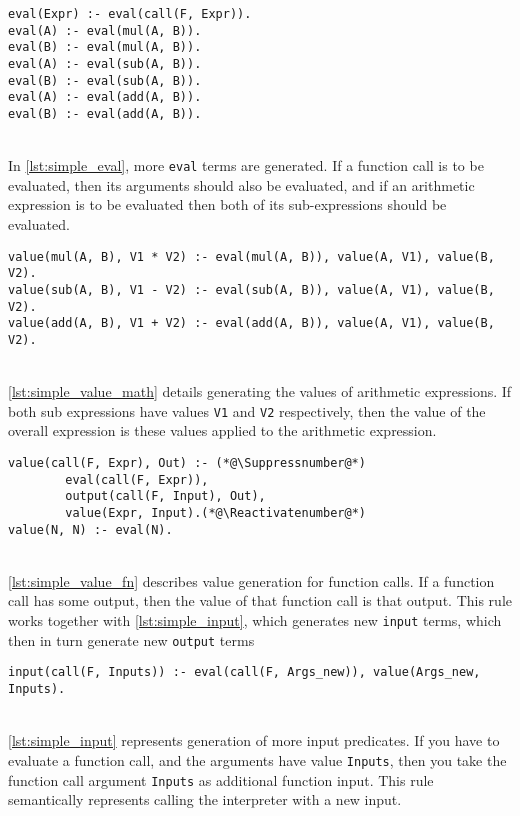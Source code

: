 \begin{lstlisting}[caption={Eval propagation}, label={lst:simple_eval}, firstnumber=77]
eval(Expr) :- eval(call(F, Expr)).
eval(A) :- eval(mul(A, B)).
eval(B) :- eval(mul(A, B)).
eval(A) :- eval(sub(A, B)).
eval(B) :- eval(sub(A, B)).
eval(A) :- eval(add(A, B)).
eval(B) :- eval(add(A, B)).
\end{lstlisting}
\mbox{}\\
In \ref{lst:simple_eval}, more \lstinline!eval! terms are generated. If a function call is to be evaluated, then its arguments should also be evaluated, and if an arithmetic expression is to be evaluated then both of its sub-expressions should be evaluated. \\ 

\begin{lstlisting}[caption={Value generation for arithmetic}, label={lst:simple_value_math}, firstnumber=69]
value(mul(A, B), V1 * V2) :- eval(mul(A, B)), value(A, V1), value(B, V2).
value(sub(A, B), V1 - V2) :- eval(sub(A, B)), value(A, V1), value(B, V2).
value(add(A, B), V1 + V2) :- eval(add(A, B)), value(A, V1), value(B, V2).
\end{lstlisting}
\mbox{}\\
\ref{lst:simple_value_math} details generating the values of arithmetic expressions. If both sub expressions have values \lstinline!V1! and \lstinline!V2! respectively, then the value of the overall expression is these values applied to the arithmetic expression. \\

\begin{lstlisting}[caption={Value generation for function calls}, label={lst:simple_value_fn}, firstnumber=72]
value(call(F, Expr), Out) :- (*@\Suppressnumber@*)
		eval(call(F, Expr)), 
		output(call(F, Input), Out), 
		value(Expr, Input).(*@\Reactivatenumber@*)	
value(N, N) :- eval(N).
\end{lstlisting}
\mbox{}\\
\ref{lst:simple_value_fn} describes value generation for function calls. If a function call has some output, then the value of that function call is that output. This rule works together with \ref{lst:simple_input}, which generates new \lstinline!input! terms, which then in turn generate new \lstinline!output! terms\\

\begin{lstlisting}[caption={Input generation}, label={lst:simple_input}, firstnumber=121]
input(call(F, Inputs)) :- eval(call(F, Args_new)), value(Args_new, Inputs).
\end{lstlisting}
\mbox{} \\
\ref{lst:simple_input} represents generation of more input predicates. If you have to evaluate a function call, and the arguments have value \lstinline!Inputs!, then you take the function call argument \lstinline!Inputs! as additional function input. This rule semantically represents calling the interpreter with a new input.

